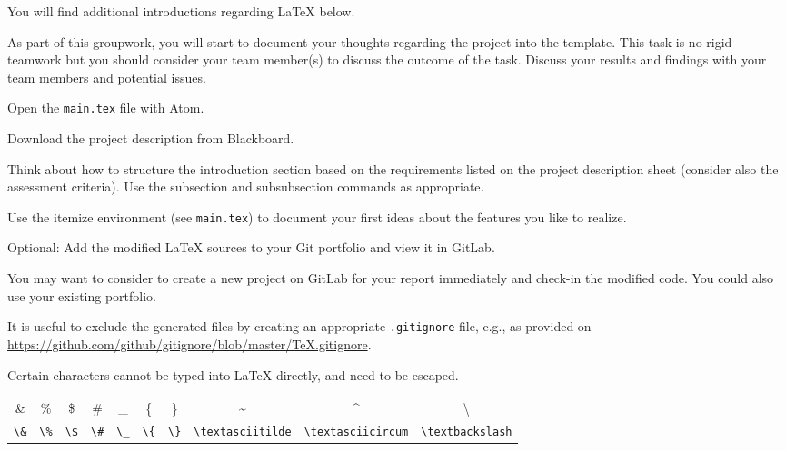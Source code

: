 You will find additional introductions regarding \LaTeX{} below.


As part of this groupwork, you will start to document your thoughts regarding the project into the template.
This task is no rigid teamwork but you should consider your team member(s) to discuss the outcome of the task.
Discuss your results and findings with your team members and potential issues.

\begin{steps}
\item Open the \verb|main.tex| file with Atom.
\item Download the project description from Blackboard.
\item Think about how to structure the introduction section based on the requirements listed on the project description sheet (consider also the assessment criteria).
Use the subsection and subsubsection commands as appropriate.
\item Use the itemize environment (see \verb|main.tex|) to document your first ideas about the features you like to realize.
\item Optional: Add the modified \LaTeX{} sources to your Git portfolio and view it in GitLab.
\end{steps}

\begin{hints}
\item You may want to consider to create a new project on GitLab for your report immediately and check-in the modified code. You could also use your existing portfolio.
\item It is useful to exclude the generated files by creating an appropriate \verb|.gitignore| file, e.g., as provided on \url{https://github.com/github/gitignore/blob/master/TeX.gitignore}.
\end{hints}


Certain characters cannot be typed into \LaTeX{} directly, and need to be escaped.

\begin{tabular}{cccccccccc}
    \& & \% & \$ & \# & \_ & \{ & \} & \textasciitilde & \textasciicircum & \textbackslash \\
    \verb|\&| & \verb|\%| & \verb|\$| & \verb|\#| & \verb|\_| & \verb|\{| & \verb|\}| & \verb|\textasciitilde| & \verb|\textasciicircum| & \verb|\textbackslash| \\
\end{tabular}

